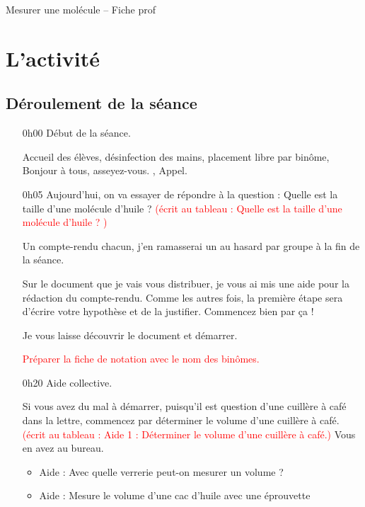 \documentclass[12pt,a4paper]{article}
\begin{document}
\begin{header}
Mesurer une molécule -- Fiche prof
\end{header}

\section{L'activité}

\subsection{Déroulement de la séance}

\begin{itemize}
\item[0h00]
Début de la séance.

Accueil des élèves, désinfection des mains, placement libre par binôme, \og Bonjour à tous, asseyez-vous. \fg{}, Appel.

\item[0h05]
\og Aujourd'hui, on va essayer de répondre à la question : Quelle est la taille d'une molécule d'huile ? 
\textcolor{red}{(écrit au tableau : Quelle est la taille d'une molécule d'huile ? )}

\og Un compte-rendu chacun,  j'en ramasserai un au hasard par groupe à la fin de la séance. \fg{}

\og Sur le document que je vais vous distribuer, je vous ai mis une aide pour la rédaction du compte-rendu.
Comme les autres fois, la première étape sera d'écrire votre hypothèse et de la justifier.
Commencez bien par ça ! \fg{} 

\og Je vous laisse découvrir le document et démarrer. \fg{}

\textcolor{red}{Préparer la fiche de notation avec le nom des binômes.}

\item[0h20]
Aide collective.

\og Si vous avez du mal à démarrer, puisqu'il est question d'une cuillère à café dans la lettre, commencez par déterminer le volume d'une cuillère à café.
\textcolor{red}{(écrit au tableau : Aide 1 : Déterminer le volume d'une cuillère à café.)}
Vous en avez au bureau. \fg{}
\begin{itemize}
\item Aide : Avec quelle verrerie peut-on mesurer un volume ?

\item Aide : Mesure le volume d'une cac d'huile avec une éprouvette


\end{itemize}
\end{itemize}
\end{document}
